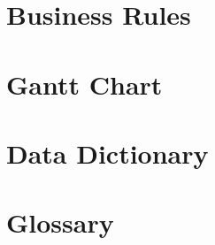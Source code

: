\chapter{Business Rules}


%

\chapter{Gantt Chart}


\chapter{Data Dictionary}


\chapter{Glossary}

